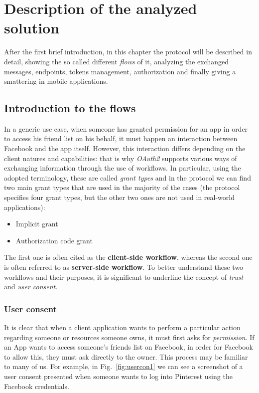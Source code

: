 \chapter{Description of the analyzed solution}
After the first brief introduction, in this chapter the protocol will be described in detail, showing the so called different \textit{flows} of it, analyzing the exchanged messages, endpoints, tokens management, authorization and finally giving a smattering in mobile applications.
\minitoc

\section{Introduction to the flows}\label{section22}
In a generic use case, when someone has granted permission for an app in order to access his friend list on his behalf, it must happen an interaction between Facebook and the app itself. However, this interaction differs depending on the client natures and capabilities: that is why \textit{OAuth2} supports various ways of exchanging information through the use of workflows.
In particular, using the adopted terminology, these are called \textit{grant types} and in the protocol we can find two main grant types that are used in the majority of the cases (the protocol specifies four grant types, but the other two ones are not used in real-world applications):

\begin{itemize}
    \item Implicit grant
    \item Authorization code grant
\end{itemize}

The first one is often cited as the \textbf{client-side workflow}, whereas the second one is often referred to as \textbf{server-side workflow}.
To better understand these two workflows and their purposes, it is significant to underline the concept of \textit{trust} and \textit{user consent}.

\subsection{User consent}
It is clear that when a client application wants to perform a particular action regarding someone or resources someone owns, it must first asks for \textit{permission}. If an App wants to access someone's friends list on Facebook, in order for Facebook to allow this, they must ask directly to the owner. This process may be familiar to many of us. For example, in Fig.~\ref{fig:usercon1} we can see a screenshot of a user consent presented when someone wants to log into Pinterest using the Facebook credentials.

